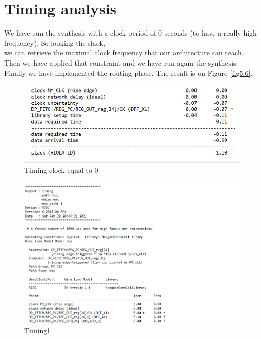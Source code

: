 \section{Timing analysis}
We have run the synthesis with a clock period of 0 seconds (to have a really high frequency). So looking the slack,\\
we can retrieve the maximal clock frequency that our architecture can reach.
Then we have applied that constraint and we have run again the synthesis.\\
Finally we have implemented the routing phase. The result is on Figure \ref{fig5.6}.
\begin{figure}[h!]
	\centering
	\includegraphics[width=18cm]{./images/RISC_tim0}
	\caption{Timing clock equal to 0}
	\label{fig5.2}
\end{figure}
\begin{figure}[h!]
	\centering
	\includegraphics[width=20cm]{./images/RISC_tim1}
	\caption{Timing1}
	\label{fig5.3}
\end{figure}
